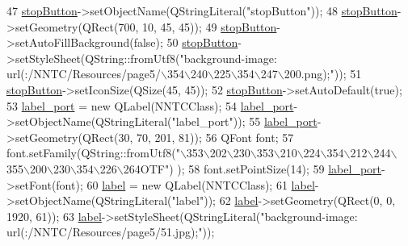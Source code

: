 \begin{DoxyCode}
47         \mbox{\hyperlink{class_ui___n_n_t_c_class_a748e190a62458531e66a574cc556e32d}{stopButton}}->setObjectName(QStringLiteral(\textcolor{stringliteral}{"stopButton"}));
48         \mbox{\hyperlink{class_ui___n_n_t_c_class_a748e190a62458531e66a574cc556e32d}{stopButton}}->setGeometry(QRect(700, 10, 45, 45));
49         \mbox{\hyperlink{class_ui___n_n_t_c_class_a748e190a62458531e66a574cc556e32d}{stopButton}}->setAutoFillBackground(\textcolor{keyword}{false});
50         \mbox{\hyperlink{class_ui___n_n_t_c_class_a748e190a62458531e66a574cc556e32d}{stopButton}}->setStyleSheet(QString::fromUtf8(\textcolor{stringliteral}{"background-image:
       url(:/NNTC/Resources/page5/\(\backslash\)354\(\backslash\)240\(\backslash\)225\(\backslash\)354\(\backslash\)247\(\backslash\)200.png);"}));
51         \mbox{\hyperlink{class_ui___n_n_t_c_class_a748e190a62458531e66a574cc556e32d}{stopButton}}->setIconSize(QSize(45, 45));
52         \mbox{\hyperlink{class_ui___n_n_t_c_class_a748e190a62458531e66a574cc556e32d}{stopButton}}->setAutoDefault(\textcolor{keyword}{true});
53         \mbox{\hyperlink{class_ui___n_n_t_c_class_a81085bd25c14084fdec83b6527ad7a4c}{label\_port}} = \textcolor{keyword}{new} QLabel(NNTCClass);
54         \mbox{\hyperlink{class_ui___n_n_t_c_class_a81085bd25c14084fdec83b6527ad7a4c}{label\_port}}->setObjectName(QStringLiteral(\textcolor{stringliteral}{"label\_port"}));
55         \mbox{\hyperlink{class_ui___n_n_t_c_class_a81085bd25c14084fdec83b6527ad7a4c}{label\_port}}->setGeometry(QRect(30, 70, 201, 81));
56         QFont font;
57         font.setFamily(QString::fromUtf8(\textcolor{stringliteral}{"\(\backslash\)353\(\backslash\)202\(\backslash\)230\(\backslash\)353\(\backslash\)210\(\backslash\)224\(\backslash\)354\(\backslash\)212\(\backslash\)244\(\backslash\)355\(\backslash\)200\(\backslash\)230\(\backslash\)354\(\backslash\)226\(\backslash\)264OTF"})
      );
58         font.setPointSize(14);
59         \mbox{\hyperlink{class_ui___n_n_t_c_class_a81085bd25c14084fdec83b6527ad7a4c}{label\_port}}->setFont(font);
60         \mbox{\hyperlink{class_ui___n_n_t_c_class_a4bb97de507bbb57b6d45f102b06a868f}{label}} = \textcolor{keyword}{new} QLabel(NNTCClass);
61         \mbox{\hyperlink{class_ui___n_n_t_c_class_a4bb97de507bbb57b6d45f102b06a868f}{label}}->setObjectName(QStringLiteral(\textcolor{stringliteral}{"label"}));
62         \mbox{\hyperlink{class_ui___n_n_t_c_class_a4bb97de507bbb57b6d45f102b06a868f}{label}}->setGeometry(QRect(0, 0, 1920, 61));
63         \mbox{\hyperlink{class_ui___n_n_t_c_class_a4bb97de507bbb57b6d45f102b06a868f}{label}}->setStyleSheet(QStringLiteral(\textcolor{stringliteral}{"background-image: url(:/NNTC/Resources/page5/51.jpg);"}));

\end{DoxyCode}
